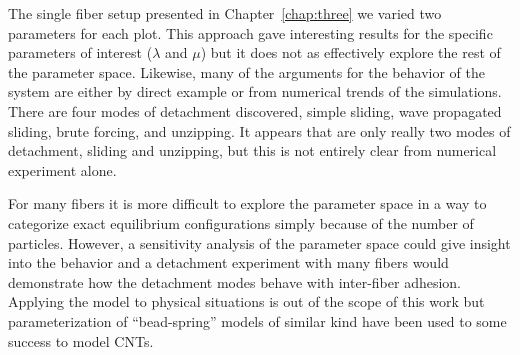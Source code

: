 The single fiber setup presented in Chapter~\ref{chap:three} we varied two parameters for each plot.
This approach gave interesting results for the specific parameters of interest ($\lambda$ and $\mu$) but it does not as effectively explore the rest of the parameter space.
Likewise, many of the arguments for the behavior of the system are either by direct example or from numerical trends of the simulations.
There are four modes of detachment discovered, simple sliding, wave propagated sliding, brute forcing, and unzipping.
It appears that are only really two modes of detachment, sliding and unzipping, but this is not entirely clear from numerical experiment alone.

For many fibers it is more difficult to explore the parameter space in a way to categorize exact equilibrium configurations simply because of the number of particles.
However, a sensitivity analysis of the parameter space could give insight into the behavior and a detachment experiment with many fibers would demonstrate how the detachment modes behave with inter-fiber adhesion.
Applying the model to physical situations is out of the scope of this work but parameterization of ``bead-spring'' models of similar kind have been used to some success to model CNTs.


